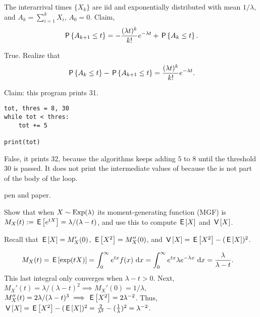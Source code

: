 \documentclass[stochastic-or.tex]{subfiles}
\begin{document}
\begin{truefalse}
The interarrival times $\{X_k\}$ are iid and exponentially distributed with mean $1/\lambda$, and $A_k = \sum_{i=1}^k X_i$, $A_{0} = 0$.
Claim,
\begin{equation*}
\P{A_{k+1} \leq t}
= - \frac{(\lambda t)^{k}}{k!} e^{-\lambda t} + \P{A_k \leq t}.
\end{equation*}
\begin{solution}
 True. Realize that
\begin{equation*}
\P{A_k \leq t} - \P{A_{k+1} \leq t} = \frac{(\lambda t)^{k}}{k!} e^{-\lambda t}.
\end{equation*}
\end{solution}
\end{truefalse}

\begin{truefalse}
Claim: this program prints 31.
\begin{verbatim}
tot, thres = 8, 30
while tot < thres:
    tot += 5

print(tot)
\end{verbatim}
\begin{solution}
False, it prints 32, because the algorithms keeps adding $5$ to 8 until the threshold 30 is passed. It does not print the intermediate values of  because the  is not part of the body of the loop.
\end{solution}
\end{truefalse}


 pen and paper.

\begin{exercise}\label{ex:11}
Show that when $X\sim \Exp{\lambda}$ its moment-generating function (MGF) is $ M_X(t) := \E{e^{tX}} = \lambda/(\lambda -t)$, and use this to compute $\E X$ and $\V X$.
\begin{hint}
Recall that $\E X = M_{X}'(0)$, $\E{X^{2}} = M_{X}''(0)$, and $\V X = \E{X^{2}} - (\E X)^{2}$.
\end{hint}
\begin{solution}
 \begin{align*}
 M_X(t) &= \E{\exp(t X)}
=\int_0^\infty e^{tx} f(x) \,\d x
=\int_0^\infty e^{tx} \lambda e^{-\lambda x} \,\d x =\frac{\lambda}{\lambda -t}.
 \end{align*}
This last integral only converges when $\lambda -t > 0$. Next, $M_X'(t)=\lambda/(\lambda-t)^2 \implies M_X'(0)=1/\lambda$, $M_X''(t)=2\lambda/(\lambda-t)^3 \implies \E{X^2}=2\lambda^{-2}$.
Thus, $\V X = \E{X^2} - (\E X)^2 = \frac{2}{\lambda^2} - (\frac{1}{\lambda})^2 = \lambda^{-2}$.
\end{solution}
\end{exercise}
\end{document}
